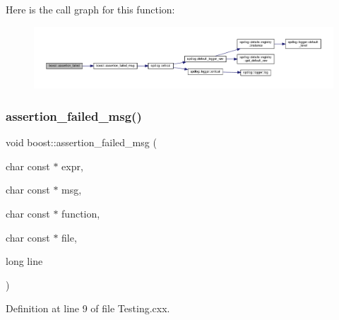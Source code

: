Here is the call graph for this function\+:
\nopagebreak
\begin{figure}[H]
\begin{center}
\leavevmode
\includegraphics[width=350pt]{namespaceboost_a6ea615b0e29a9b35870fb8662f0e1291_cgraph}
\end{center}
\end{figure}
\mbox{\label{namespaceboost_afbd4a259de77230355c3c2de9ce6d6c9}} 
\subsubsection{\texorpdfstring{assertion\+\_\+failed\+\_\+msg()}{assertion\_failed\_msg()}}
{\footnotesize\ttfamily void boost\+::assertion\+\_\+failed\+\_\+msg (\begin{DoxyParamCaption}\item[{char const $\ast$}]{expr,  }\item[{char const $\ast$}]{msg,  }\item[{char const $\ast$}]{function,  }\item[{char const $\ast$}]{file,  }\item[{long}]{line }\end{DoxyParamCaption})}



Definition at line 9 of file Testing.\+cxx.

